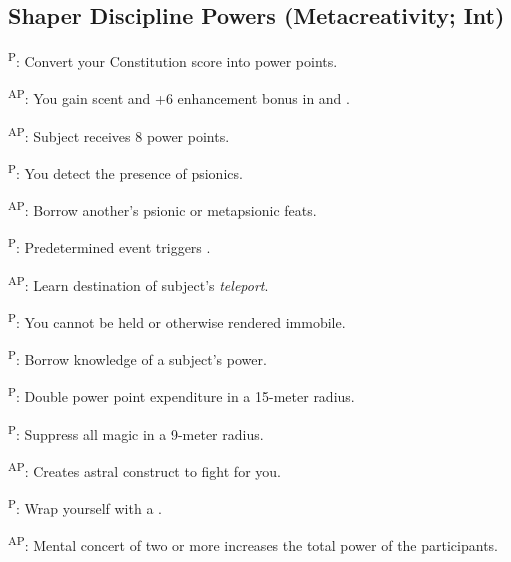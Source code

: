 \subsection{Shaper Discipline Powers {\normalsize(Metacreativity; Int)}}
\begin{enumerate*}
\item {}\textsuperscript{P}: Convert your Constitution score into power points.

      \textsuperscript{AP}: You gain scent and +6 enhancement bonus in  and .

\item {}\textsuperscript{AP}: Subject receives 8 power points. %

      \textsuperscript{P}: You detect the presence of psionics.

      \textsuperscript{AP}: Borrow another's psionic or metapsionic feats. %


      \textsuperscript{P}: Predetermined event triggers .

\item {}\textsuperscript{AP}: Learn destination of subject's \emph{teleport}. %

\item {}\textsuperscript{P}: You cannot be held or otherwise rendered immobile.

      \textsuperscript{P}: Borrow knowledge of a subject's power.

      \textsuperscript{P}: Double power point expenditure in a 15-meter radius.

\item {}\textsuperscript{P}: Suppress all magic in a 9-meter radius.

      \textsuperscript{AP}: Creates astral construct to fight for you. %

      \textsuperscript{P}: Wrap yourself with a .

      \textsuperscript{AP}: Mental concert of two or more increases the total power of the participants. %


\end{enumerate*}
